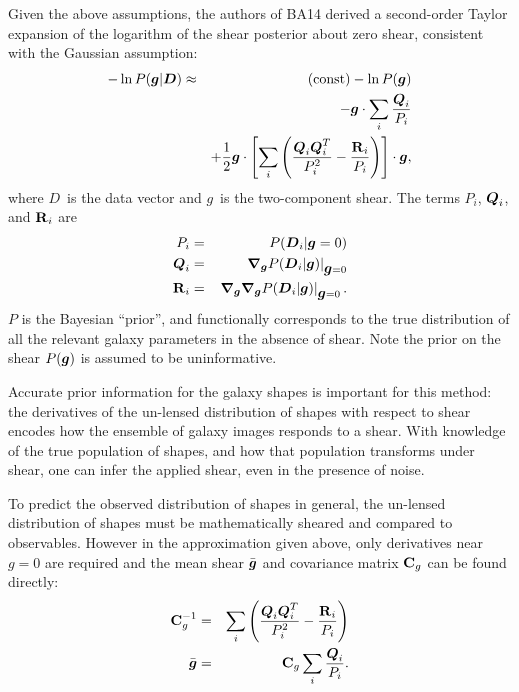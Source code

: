\documentclass[usegraphicx,usenatbib]{mn2e}
\newcommand{\vecg}{\mbox{\boldmath $g$}}
\newcommand{\vecD}{\mbox{\boldmath $D$}}
\newcommand{\vecQ}{\mbox{\boldmath $Q$}}
\newcommand{\matR}{\mbox{$\bf R$}}
\newcommand{\matC}{\mbox{$\bf C$}}
\newcommand{\bnabg}{ \boldsymbol{\nabla_g}}
\begin{document}
Given the above assumptions, the authors of BA14 derived a second-order Taylor
expansion of the logarithm of the shear posterior about zero shear, consistent
with the Gaussian assumption:
\begin{eqnarray} \label{eq:pexpand}
    -\ln P(\vecg | \vecD) & \approx & {(\rm const)} - \ln P(\vecg) \nonumber \\
                          & & - \vecg \cdot \sum_i \frac{\vecQ_i}{P_i} \\
    & &
    + \frac{1}{2} \vecg \cdot \left[ \sum_i \left(\frac{\vecQ_i \vecQ^T_i}{P_i^2}
    - \frac{\matR_i}{P_i}\right) \right] \cdot \vecg, \nonumber
\end{eqnarray}
where \vecD\ is the data vector and \vecg\ is the two-component shear.  The
terms $P_i$, $\vecQ_i$, and $\matR_i$ are 
\begin{eqnarray} \label{eq:pqrdef}
P_i     & = & P(\vecD_i | \vecg=0) \nonumber \\
\vecQ_i & = & \left. \bnabg P(\vecD_i | \vecg)\right|_{\vecg=0} \\
\matR_i & = & \left. \bnabg \bnabg P(\vecD_i | \vecg)\right|_{\vecg=0}. \nonumber
\end{eqnarray}
$P$ is the Bayesian ``prior'', and functionally corresponds to the true
distribution of all the relevant galaxy parameters in the absence of shear.
Note the prior on the shear $P(\vecg)$ is assumed to be uninformative.

Accurate prior information for the galaxy shapes is important for this method:
the derivatives of the un-lensed distribution of shapes with respect to shear
encodes how the ensemble of galaxy images responds to a shear. With knowledge of
the true population of shapes, and how that population transforms under shear,
one can infer the applied shear, even in the presence of noise.

To predict the observed distribution of shapes in general, the un-lensed
distribution of shapes must be mathematically sheared and compared to
observables.  However in the approximation given above, only derivatives near
$g=0$ are required and the mean shear $\bar{\vecg}$ and covariance matrix
$\matC_g$ can be found directly:
\begin{eqnarray}
\matC_g^{-1} & = & \sum_i \left(\frac{\vecQ_i \vecQ^T_i}{P_i^2} - \frac{\matR_i}{P_i}\right) \label{eq:cdef} \nonumber \\
\bar{\vecg} & = &  \matC_g \sum_i \frac{\vecQ_i}{P_i}. \label{eq:shdef}
\end{eqnarray}
\end{document}
